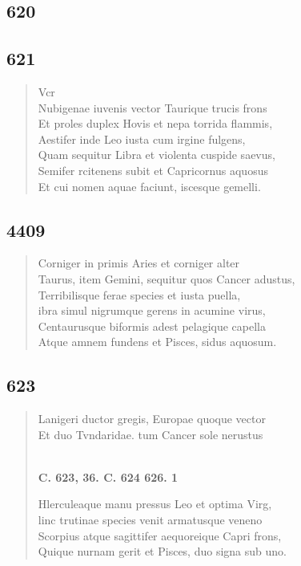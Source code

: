 \documentclass[11pt, a4paper]{report}
\begin{document}
            \subsection*{620}
      \begin{verse}
      \end{verse}
  
            \subsection*{621}
      \begin{verse}
      Vcr \\ Nubigenae iuvenis vector Taurique trucis frons \\ Et proles duplex Hovis et nepa torrida flammis, \\ Aestifer inde Leo iusta cum irgine fulgens, \\ Quam sequitur Libra et violenta cuspide saevus, \\ Semifer rcitenens subit et Capricornus aquosus \\ Et cui nomen aquae faciunt, iscesque gemelli. \\ 
      \end{verse}
  
            \subsection*{4409}
      \begin{verse}
      Corniger in primis Aries et corniger alter \\ Taurus, item Gemini, sequitur quos Cancer adustus, \\ Terribilisque ferae species et iusta puella, \\ ibra simul nigrumque gerens in acumine virus, \\ Centaurusque biformis adest pelagique capella \\ Atque amnem fundens et Pisces, sidus aquosum. \\ 
      \end{verse}
  
            \subsection*{623}
      \begin{verse}
      Lanigeri ductor gregis, Europae quoque vector \\ Et duo Tvndaridae. tum Cancer sole nerustus \\ 
        ﻿\pagebreak 
    \begin{center} \textbf{C. 623, 36. C. 624 626. 1} \end{center} \marginpar{[94]} Hlerculeaque manu pressus Leo et optima Virg, \\ linc trutinae species venit armatusque veneno \\ Scorpius atque sagittifer aequoreique Capri frons, \\ Quique nurnam gerit et Pisces, duo signa sub uno. \\ 
      \end{verse}
  
\end{document}
